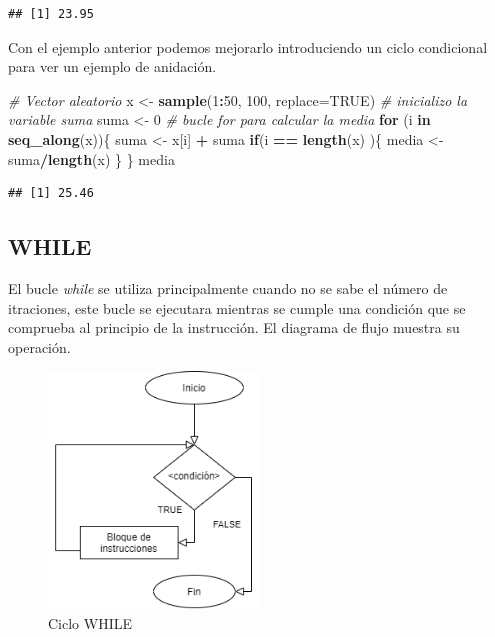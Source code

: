\documentclass[11pt,]{article}
\newenvironment{Shaded}{\begin{snugshade}}{\end{snugshade}}
\newcommand{\CommentTok}[1]{\textcolor[rgb]{0.56,0.35,0.01}{\textit{#1}}}
\newcommand{\ControlFlowTok}[1]{\textcolor[rgb]{0.13,0.29,0.53}{\textbf{#1}}}
\newcommand{\DataTypeTok}[1]{\textcolor[rgb]{0.13,0.29,0.53}{#1}}
\newcommand{\DecValTok}[1]{\textcolor[rgb]{0.00,0.00,0.81}{#1}}
\newcommand{\KeywordTok}[1]{\textcolor[rgb]{0.13,0.29,0.53}{\textbf{#1}}}
\newcommand{\NormalTok}[1]{#1}
\newcommand{\OperatorTok}[1]{\textcolor[rgb]{0.81,0.36,0.00}{\textbf{#1}}}
\newcommand{\OtherTok}[1]{\textcolor[rgb]{0.56,0.35,0.01}{#1}}
\newcommand{\StringTok}[1]{\textcolor[rgb]{0.31,0.60,0.02}{#1}}
\begin{document}
\begin{verbatim}
## [1] 23.95
\end{verbatim}

Con el ejemplo anterior podemos mejorarlo introduciendo un ciclo
condicional para ver un ejemplo de anidación.

\begin{Shaded}
\begin{Highlighting}[]
\CommentTok{# Vector aleatorio}
\NormalTok{x <-}\StringTok{ }\KeywordTok{sample}\NormalTok{(}\DecValTok{1}\OperatorTok{:}\DecValTok{50}\NormalTok{, }\DecValTok{100}\NormalTok{, }\DataTypeTok{replace=}\OtherTok{TRUE}\NormalTok{)}
\CommentTok{# inicializo la variable suma}
\NormalTok{suma <-}\StringTok{ }\DecValTok{0}
\CommentTok{# bucle for para calcular la media}
\ControlFlowTok{for}\NormalTok{ (i }\ControlFlowTok{in} \KeywordTok{seq_along}\NormalTok{(x))\{}
\NormalTok{  suma <-}\StringTok{ }\NormalTok{x[i] }\OperatorTok{+}\StringTok{ }\NormalTok{suma}
  \ControlFlowTok{if}\NormalTok{(i }\OperatorTok{==}\StringTok{ }\KeywordTok{length}\NormalTok{(x) )\{}
\NormalTok{    media <-}\StringTok{ }\NormalTok{suma}\OperatorTok{/}\KeywordTok{length}\NormalTok{(x)}
\NormalTok{  \}}
\NormalTok{\}}
\NormalTok{media}
\end{Highlighting}
\end{Shaded}

\begin{verbatim}
## [1] 25.46
\end{verbatim}

\hypertarget{while}{%
\subsection{WHILE}\label{while}}

El bucle \emph{while} se utiliza principalmente cuando no se sabe el
número de itraciones, este bucle se ejecutara mientras se cumple una
condición que se comprueba al principio de la instrucción. El diagrama
de flujo muestra su operación.

\begin{figure}
\hypertarget{id}{%
\centering
\includegraphics[width=0.5\textwidth,height=0.3\textheight]{../schemas/WHILE.png}
\caption{Ciclo WHILE}\label{id}
}
\end{figure}
\end{document}
